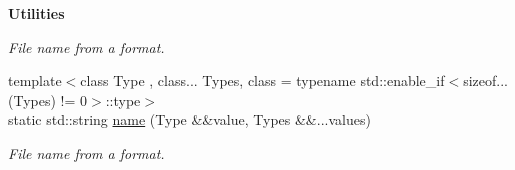 \begin{Indent}{\bf Utilities}
\begin{DoxyCompactItemize}
\begin{DoxyCompactList}\small\item\em File name from a format. \end{DoxyCompactList}\item 
{\footnotesize template$<$class Type , class... Types, class  = typename std\-::enable\-\_\-if$<$sizeof...(\-Types) != 0$>$\-::type$>$ }\\static std\-::string \hyperlink{exceptionOutput_a4f4d3a620d93e4e661c62a04e14dd822}{name} (Type \&\&value, Types \&\&...values)
\begin{DoxyCompactList}\small\item\em File name from a format. \end{DoxyCompactList}\end{DoxyCompactItemize}
\end{Indent}
